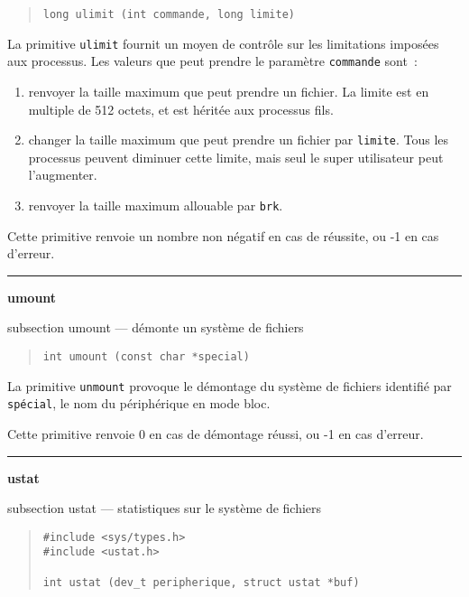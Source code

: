 \documentclass [twoside] {report}
\newcommand {\primitive} [1]
    {
	{\large \bf #1}
	\addcontentsline {toc} {subsection} {#1}
    }
\newcommand {\separation}
    {
	\vspace {7mm}
	\nopagebreak
	\hrule
    }
\begin{document}
\begin {quote}
\begin {verbatim}
long ulimit (int commande, long limite)
\end{verbatim}
\end {quote}

La primitive {\tt ulimit} fournit un moyen de
contrôle sur les limitations imposées aux
processus. Les valeurs que peut prendre le
paramètre {\tt commande} sont~:

\begin {enumerate}
    \item renvoyer la taille maximum que peut prendre
	un fichier. La limite est en multiple de 512
	octets, et est héritée aux processus fils.
    \item changer la taille maximum que peut prendre
	un fichier par {\tt limite}. Tous les processus
	peuvent diminuer cette limite, mais seul le super
	utilisateur peut l'augmenter.
    \item renvoyer la taille maximum allouable par {\tt brk}.
\end {enumerate}

Cette primitive renvoie un nombre non négatif en
cas de réussite, ou -1 en cas d'erreur.




\separation
\primitive {umount} --- démonte un système de fichiers

\begin {quote}
\begin {verbatim}
int umount (const char *special)
\end{verbatim}
\end {quote}

La primitive {\tt unmount} provoque le démontage du
système de fichiers identifié par {\tt spécial}, le nom du
périphérique en mode bloc.

Cette primitive renvoie 0 en cas de démontage
réussi, ou -1 en cas d'erreur.




\separation
\primitive {ustat} --- statistiques sur le système de fichiers

\begin {quote}
\begin {verbatim}
#include <sys/types.h>
#include <ustat.h>

int ustat (dev_t peripherique, struct ustat *buf)
\end{verbatim}
\end {quote}
\end{document}
